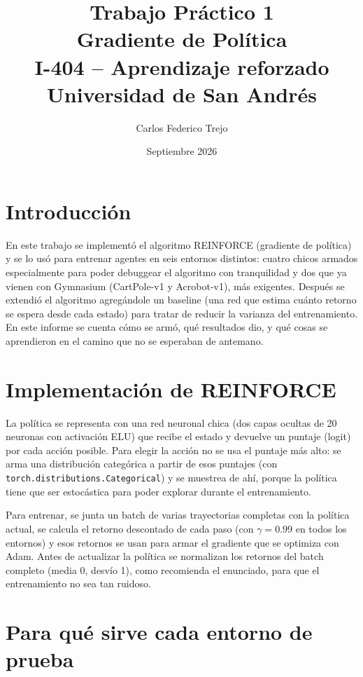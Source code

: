 \documentclass[10pt, a4paper, twocolumn]{article}
\title{
    \textbf{Trabajo Práctico 1} \\
    \large Gradiente de Política \\
    \normalsize I-404 -- Aprendizaje reforzado \\
    Universidad de San Andrés
}
\author{Carlos Federico Trejo}  %
\date{Septiembre 2026}
\begin{document}
\maketitle


\section{Introducción}

En este trabajo se implementó el algoritmo REINFORCE (gradiente de política) y se lo usó para entrenar agentes en seis entornos distintos: cuatro chicos armados especialmente para poder debuggear el algoritmo con tranquilidad y dos que ya vienen con Gymnasium (CartPole-v1 y Acrobot-v1), más exigentes. Después se extendió el algoritmo agregándole un baseline (una red que estima cuánto retorno se espera desde cada estado) para tratar de reducir la varianza del entrenamiento. En este informe se cuenta cómo se armó, qué resultados dio, y qué cosas se aprendieron en el camino que no se esperaban de antemano.

\section{Implementación de REINFORCE}

La política se representa con una red neuronal chica (dos capas ocultas de 20 neuronas con activación ELU) que recibe el estado y devuelve un puntaje (logit) por cada acción posible. Para elegir la acción no se usa el puntaje más alto: se arma una distribución categórica a partir de esos puntajes (con \texttt{torch.distributions.Categorical}) y se muestrea de ahí, porque la política tiene que ser estocástica para poder explorar durante el entrenamiento.

Para entrenar, se junta un batch de varias trayectorias completas con la política actual, se calcula el retorno descontado de cada paso (con $\gamma = 0.99$ en todos los entornos) y esos retornos se usan para armar el gradiente que se optimiza con Adam. Antes de actualizar la política se normalizan los retornos del batch completo (media 0, desvío 1), como recomienda el enunciado, para que el entrenamiento no sea tan ruidoso.

\section{Para qué sirve cada entorno de prueba}
\end{document}
